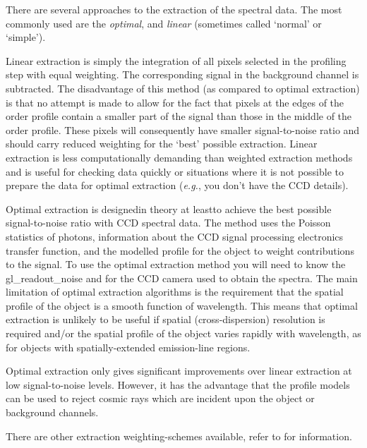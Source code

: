 There are several approaches to the extraction of the spectral data.
The most commonly used are the {\sl optimal}, and {\sl linear} (sometimes
called `normal' or `simple').

Linear extraction is simply the integration of all pixels selected in
the profiling step with equal weighting.  The corresponding signal in
the background channel is subtracted.  The disadvantage of this
method (as compared to optimal extraction) is that no attempt is made to
allow for the fact that pixels at the edges of the order profile contain
a smaller part of the signal than those in the middle of the order
profile.  These pixels will consequently have smaller signal-to-noise
ratio and should carry reduced weighting for the `best' possible
extraction.  Linear extraction is less computationally demanding than
weighted extraction methods and is useful for checking data quickly or
situations where it is not possible to prepare the data for optimal
extraction ({\em{e.g.}}, you don't have the CCD
 details).

Optimal extraction is designed\sgspec{---}{ - }in theory at
least\sgspec{---}{ - }to achieve the best
possible signal-to-noise ratio with CCD spectral data.  The method uses
the Poisson statistics of photons, information about the CCD signal
processing electronics transfer function, and the modelled profile for
the object to weight contributions to the signal.  To use the optimal
extraction method you will need to know the 
{gl_readout_noise} and  for the CCD
camera used to obtain the spectra.
The main limitation of optimal extraction algorithms is the requirement
that the spatial profile of the object is a smooth function of wavelength.
This means that optimal extraction is unlikely to be useful if spatial
(cross-dispersion) resolution is required and/or the spatial profile
of the object varies rapidly with wavelength, as for objects with
spatially-extended emission-line regions.

Optimal extraction only gives significant improvements over linear
extraction at low signal-to-noise levels.  However, it has the
advantage that the profile models can be used to reject cosmic rays
which are incident upon the object or background channels.

There are other extraction weighting-schemes available, refer to
\sgspec{\S \ref{se_facilities}}
{}
for information.

